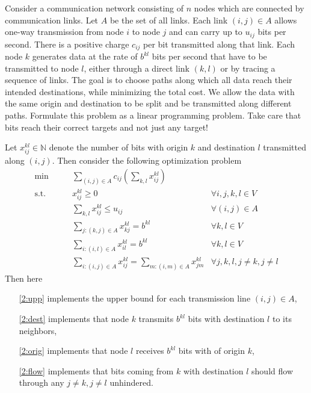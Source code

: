 \documentclass{article}
\begin{document}
\begin{exercise}[LP Modeling]
    Consider a communication network consisting of $n$ nodes which are connected by communication links. Let $A$ be the set of all links. Each link $(i,j)\in A$ allows one-way transmission from node $i$ to node $j$ and can carry up to $u_{ij}$ bits per second. There is a positive charge $c_{ij}$ per bit transmitted along that link. Each node $k$ generates data at the rate of $b^{kl}$ bits per second that have to be transmitted to node $l$, either through a direct link $(k,l)$ or by tracing a sequence of links. The goal is to choose paths along which all data reach their intended destinations, while minimizing the total cost. We allow the data with the same origin and destination to be split and be transmitted along different paths. Formulate this problem as a linear programming problem. Take care that bits reach their correct targets and not just any target!
\end{exercise}
\begin{solving}
    Let $x_{ij}^{kl} \in \mathbb N$ denote the number of bits with origin $k$ and destination $l$ transmitted along $(i,j)$. Then consider the following optimization problem\begin{align}
        \min \qquad & \sum_{(i,j)\in A} c_{ij}\left(\sum_{k,l} x_{ij}^{kl}\right)\\
        \text{s.t.}\qquad & x_{ij}^{kl}\geq 0 &\forall i,j,k,l\in V\\
        &\sum_{k,l}x_{ij}^{kl}\leq u_{ij}& \forall (i,j)\in A\label{2:upp}\\
        & \sum_{j: (k,j)\in A} x_{kj}^{kl} = b^{kl}& \forall k,l\in V \label{2:dest}\\
        & \sum_{i: (i,l)\in A} x_{il}^{kl} = b^{kl}& \forall k,l\in V \label{2:orig}\\
        & \sum_{i: (i,j)\in A} x_{ij}^{kl} = \sum _{m: (i,m)\in A} x_{jm}^{kl} & \forall j,k,l, j\neq k, j\neq l \label{2:flow}
    \end{align}
    Then here \begin{enumerate}
        \item [\eqref{2:upp}] implements the upper bound for each transmission line $(i,j)\in A$,
        \item [\eqref{2:dest}] implements that node $k$ transmits $b^{kl}$ bits with destination $l$ to its neighbors,
        \item [\eqref{2:orig}] implements that node $l$ receives $b^{kl}$ bits with of origin $k$,
        \item [\eqref{2:flow}] implements that bits coming from $k$ with destination $l$ should flow through any $j\neq k, j\neq l$ unhindered.
    \end{enumerate}
\end{solving}
\end{document}
